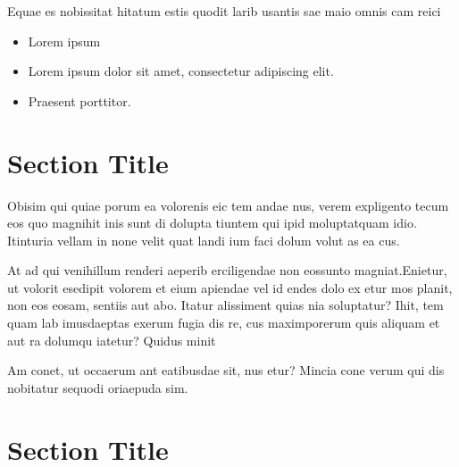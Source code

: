 \documentclass[
]{ImperialPoster}
\begin{document}
\begin{multicols}{3}

	Equae es nobissitat hitatum estis quodit larib usantis sae maio omnis cam reici


	\begin{itemize}
		\item Lorem ipsum
		\item Lorem ipsum dolor sit amet, consectetur adipiscing elit.
		\item Praesent porttitor.
	\end{itemize}

	\columnbreak{} %


	\section{Section Title}

	{
		\small %
		Obisim qui quiae porum ea volorenis eic tem andae nus, verem expligento tecum eos quo magnihit inis sunt di dolupta tiuntem qui ipid moluptatquam idio. Itinturia vellam in none velit quat landi ium faci dolum volut as ea cus.

		At ad qui venihillum renderi aeperib erciligendae non eossunto magniat.Enietur, ut volorit esedipit volorem et eium apiendae vel id endes dolo ex etur mos planit, non eos eosam, sentiis aut abo. Itatur alissiment quias nia soluptatur? Ihit, tem quam lab imusdaeptas exerum fugia dis re, cus maximporerum quis aliquam et aut ra dolumqu iatetur? Quidus minit

		Am conet, ut occaerum ant eatibusdae sit, nus etur? Mincia cone verum qui dis nobitatur sequodi oriaepuda sim.\par
	}

	\vspace{0.405\textheight} %

	\section{Section Title}


\end{multicols}
\end{document}
